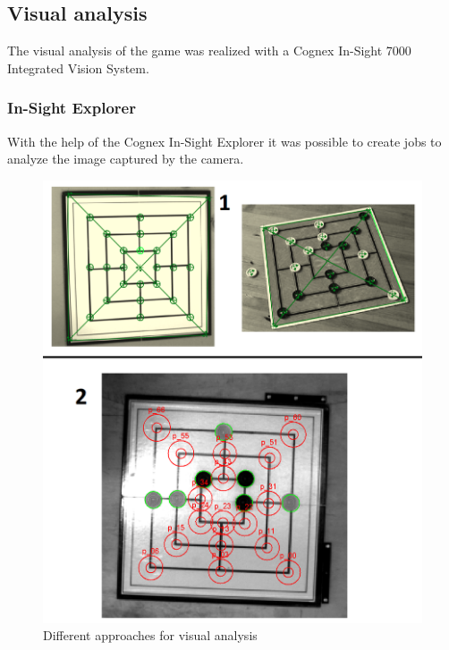 \documentclass[a4paper]{spie}  %
\begin{document}
\begin{large}
\subsection{Visual analysis}
\label{visual_analysis}
The visual analysis of the game was realized with a Cognex In-Sight 7000 Integrated Vision System. 
\subsubsection{In-Sight Explorer}
With the help of the Cognex In-Sight Explorer it was possible to create jobs to analyze the image captured by the camera.\\
\begin{figure}[h]
\includegraphics[width=15cm]{images/camera_00.png}
\centering
\caption{Different approaches for visual analysis}
\label{camera_00}
\end{figure}

\end{large}
\end{document}
